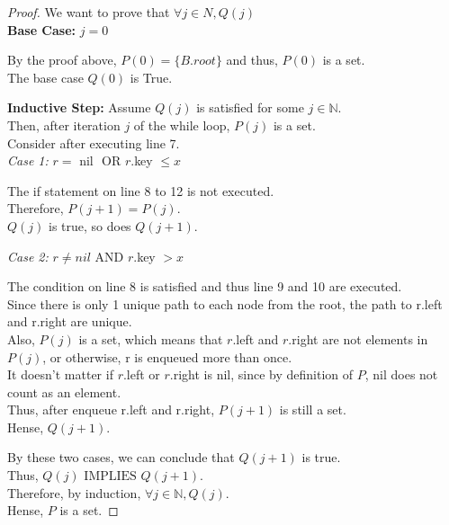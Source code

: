 \documentclass[10pt]{article}
\newcommand{\iimplies}{\mbox{ IMPLIES }}
\newcommand{\oor}{\mbox{ OR }}
\newcommand{\aand}{\mbox{ AND }}
\begin{document}
\begin{enumerate}
\begin{addmargin}[1em]{0em}
\begin{proof}
        We want to prove that $\forall j \in N, Q(j)$ \\
        \textbf{Base Case:} $j = 0$
        \begin{addmargin}[1em]{0em}
            By the proof above, $P(0) = \{ B.root \}$ and thus, $P(0)$ is a set. \\
            The base case $Q(0)$ is True.
        \end{addmargin}
        \textbf{Inductive Step:}
            Assume $Q(j)$ is satisfied for some $j \in \mathbb{N}$. \\
            Then, after iteration $j$ of the while loop, $P(j)$ is a set. \\
            Consider after executing line 7. \\
            \textit{Case 1:} $r =$ nil $\oor r.$key $\leq x$
            \begin{addmargin}[1em]{0em}
                The if statement on line 8 to 12 is not executed. \\
                Therefore, $P(j+1) = P(j)$. \\
                $Q(j)$ is true, so does $Q(j+1)$.
            \end{addmargin}
            \textit{Case 2:} $r \neq nil \aand r.$key $> x$
            \begin{addmargin}[1em]{0em}
               The condition on line 8 is satisfied and thus line 9 and 10 are executed. \\
               Since there is only 1 unique path to each node from the root, the path to r.left and r.right are unique. \\
               Also, $P(j)$ is a set, which means that $r$.left and $r$.right are not elements in $P(j)$, or otherwise, r is enqueued more than once. \\
               It doesn't matter if $r$.left or $r$.right is nil, since by definition of $P$, nil does not count as an element. \\
               Thus, after enqueue r.left and r.right, $P(j+1)$ is still a set. \\
               Hense, $Q(j+1)$.
            \end{addmargin}
            By these two cases, we can conclude that $Q(j+1)$ is true. \\
            Thus, $Q(j) \iimplies Q(j+1)$. \\
            Therefore, by induction, $\forall j \in \mathbb{N}, Q(j)$. \\
            Hense, $P$ is a set.
    \end{proof}
\end{addmargin}


\end{enumerate}
\end{document}
